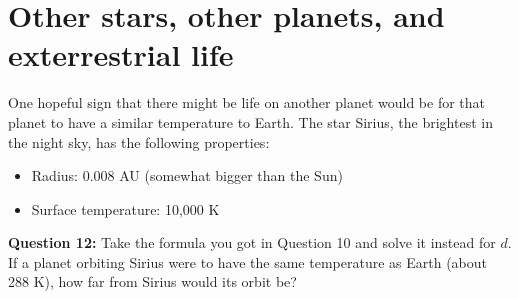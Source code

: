 \documentclass[11pt]{article}
\def\BI{\begin{itemize}}
\def\EI{\end{itemize}}
\begin{document}
\newpage
\section*{Other stars, other planets, and exterrestrial life}

One hopeful sign that there might be life on another planet would be for that planet to have a similar temperature to Earth. The star Sirius, the brightest in the night sky, 
has the following properties:

\BI
\item Radius: 0.008 AU (somewhat bigger than the Sun)
\item Surface temperature: 10,000 K
\EI

{\bf Question 12:} Take the formula you got in Question 10 and solve it instead for $d$. If a planet orbiting Sirius were to have the same temperature as Earth (about 288 K), 
how far from Sirius would its orbit be?
\end{document}
